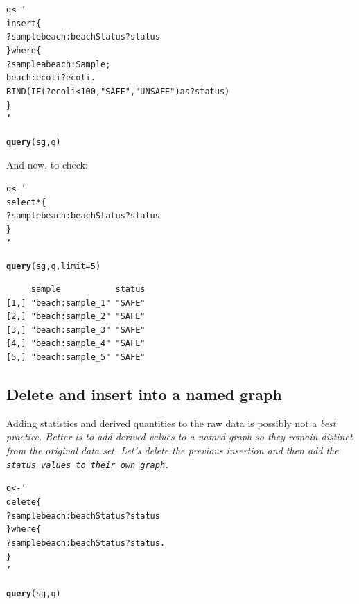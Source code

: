 \documentclass{article}\usepackage[]{graphicx}\usepackage[]{xcolor}
\makeatletter
\newcommand{\hlnum}[1]{\textcolor[rgb]{0.686,0.059,0.569}{#1}}%
\newcommand{\hlstr}[1]{\textcolor[rgb]{0.192,0.494,0.8}{#1}}%
\newcommand{\hlstd}[1]{\textcolor[rgb]{0.345,0.345,0.345}{#1}}%
\newcommand{\hlkwb}[1]{\textcolor[rgb]{0.69,0.353,0.396}{#1}}%
\newcommand{\hlkwc}[1]{\textcolor[rgb]{0.333,0.667,0.333}{#1}}%
\newcommand{\hlkwd}[1]{\textcolor[rgb]{0.737,0.353,0.396}{\textbf{#1}}}%
\newenvironment{kframe}{%
 \def\at@end@of@kframe{}%
 \ifinner\ifhmode%
  \def\at@end@of@kframe{\end{minipage}}%
  \begin{minipage}{\columnwidth}%
 \fi\fi%
 \def\FrameCommand##1{\hskip\@totalleftmargin \hskip-\fboxsep
 \colorbox{shadecolor}{##1}\hskip-\fboxsep
     \hskip-\linewidth \hskip-\@totalleftmargin \hskip\columnwidth}%
 \MakeFramed {\advance\hsize-\width
   \@totalleftmargin\z@ \linewidth\hsize
   \@setminipage}}%
 {\par\unskip\endMakeFramed%
 \at@end@of@kframe}
\newenvironment{knitrout}{}{} %
\makeatother
\begin{document}
\begin{knitrout}
\color{fgcolor}\begin{kframe}
\begin{alltt}
\hlstd{q} \hlkwb{<-} \hlstr{'
insert \{
  ?sample beach:beachStatus ?status
\} where \{
  ?sample a beach:Sample ;
    beach:ecoli ?ecoli .
  BIND(IF(?ecoli < 100, "SAFE", "UNSAFE") as ?status)
\}
'}

\hlkwd{query}\hlstd{(sg, q)}
\end{alltt}
\end{kframe}
\end{knitrout}


And now, to check:

\begin{knitrout}
\color{fgcolor}\begin{kframe}
\begin{alltt}
\hlstd{q} \hlkwb{<-} \hlstr{'
select * \{
  ?sample beach:beachStatus ?status
\}
'}

\hlkwd{query}\hlstd{(sg, q,} \hlkwc{limit} \hlstd{=} \hlnum{5}\hlstd{)}
\end{alltt}
\end{kframe}
\end{knitrout}

\begin{verbatim}
     sample           status
[1,] "beach:sample_1" "SAFE"
[2,] "beach:sample_2" "SAFE"
[3,] "beach:sample_3" "SAFE"
[4,] "beach:sample_4" "SAFE"
[5,] "beach:sample_5" "SAFE"
\end{verbatim}

\subsection{Delete and insert into a named graph}

Adding statistics and derived quantities to the raw data is possibly not a \it{best practice}. Better is to add derived values to a named graph so they remain distinct from the original data set. Let's delete the previous insertion and then add the \tt{status} values to their own graph.

\begin{knitrout}
\color{fgcolor}\begin{kframe}
\begin{alltt}
\hlstd{q} \hlkwb{<-} \hlstr{'
delete \{
  ?sample beach:beachStatus ?status
\} where \{
  ?sample beach:beachStatus ?status .
\}
'}

\hlkwd{query}\hlstd{(sg, q)}
\end{alltt}
\end{kframe}
\end{knitrout}
\end{document}
